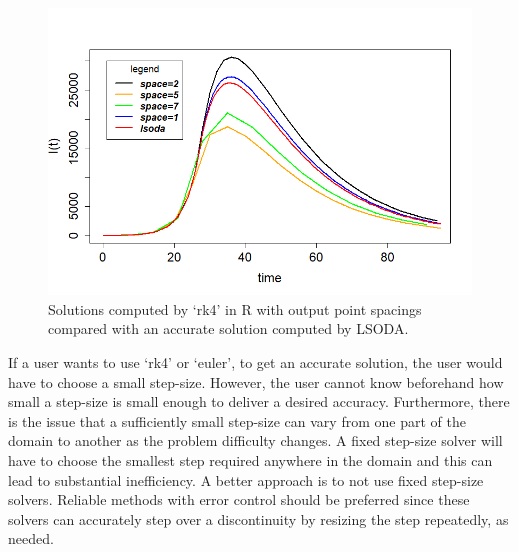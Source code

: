 \begin{figure}[H]
\centering
\includegraphics[width=0.7\linewidth]{./figures/rk4_messing_up_no_event_R}
\caption{Solutions computed by `rk4' in R with output point spacings compared with an accurate solution computed by LSODA.}
\label{fig:rk4_messing_up_no_event_R}
\end{figure}

If a user wants to use `rk4' or `euler', to get an accurate solution, the user would have to choose a small step-size. However, the user cannot know beforehand how small a step-size is small enough to deliver a desired accuracy. Furthermore, there is the issue that a sufficiently small step-size can vary from one part of the domain to another as the problem difficulty changes. A fixed step-size solver will have to choose the smallest step required anywhere in the domain and this can lead to substantial inefficiency. A better approach is to not use fixed step-size solvers. Reliable methods with error control should be preferred since these solvers can accurately step over a discontinuity by resizing the step repeatedly, as needed.

